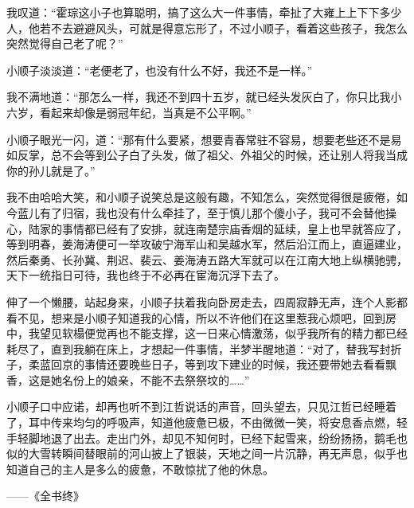 我叹道：“霍琮这小子也算聪明，搞了这么大一件事情，牵扯了大雍上上下下多少人，他若不去避避风头，可就是得意忘形了，不过小顺子，看着这些孩子，我怎么突然觉得自己老了呢？”

小顺子淡淡道：“老便老了，也没有什么不好，我还不是一样。”

我不满地道：“那怎么一样，我还不到四十五岁，就已经头发灰白了，你只比我小六岁，看起来却像是弱冠年纪，当真是不公平啊。”

小顺子眼光一闪，道：“那有什么要紧，想要青春常驻不容易，想要老些还不是易如反掌，总不会等到公子白了头发，做了祖父、外祖父的时候，还让别人将我当成你的孙儿就是了。”

我不由哈哈大笑，和小顺子说笑总是这般有趣，不知怎么，突然觉得很是疲倦，如今蓝儿有了归宿，我也没有什么牵挂了，至于慎儿那个傻小子，我可不会替他操心，陆家的事情都已经有了安排，就连南楚宗庙香烟的延续，皇上也早就答应了，等到明春，姜海涛便可一举攻破宁海军山和吴越水军，然后沿江而上，直逼建业，然后秦勇、长孙冀、荆迟、裴云、姜海涛五路大军就可以在江南大地上纵横驰骋，天下一统指日可待，我也终于不必再在宦海沉浮下去了。

伸了一个懒腰，站起身来，小顺子扶着我向卧房走去，四周寂静无声，连个人影都看不见，想来是小顺子知道我的心情，所以不许他们在这里惹我心烦吧，回到房中，我望见软榻便觉再也不能支撑，这一日来心情激荡，似乎我所有的精力都已经耗尽了，直到我躺在床上，才想起一件事情，半梦半醒地道：“对了，替我写封折子，柔蓝回京的事情还要晚些日子，等到攻下建业的时候，我还要带她去看看飘香，这是她名份上的娘亲，不能不去祭祭坟的……”

小顺子口中应诺，却再也听不到江哲说话的声音，回头望去，只见江哲已经睡着了，耳中传来均匀的呼吸声，知道他疲惫已极，不由微微一笑，将安息香点燃，轻手轻脚地退了出去。走出门外，却见不知何时，已经下起雪来，纷纷扬扬，鹅毛也似的大雪转瞬间替眼前的河山披上了银装，天地之间一片沉静，再无声息，似乎也知道自己的主人是多么的疲惫，不敢惊扰了他的休息。

——《全书终》
